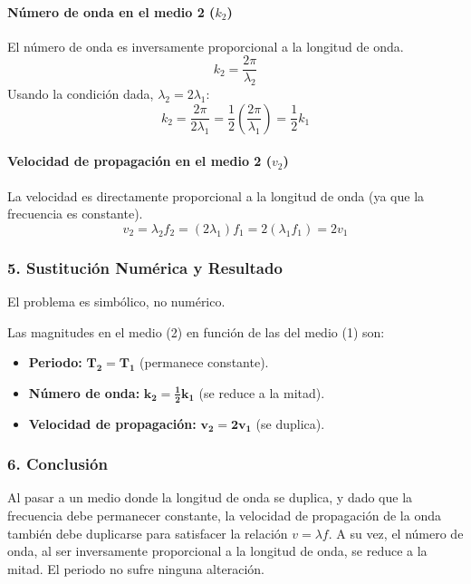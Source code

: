 \paragraph*{Número de onda en el medio 2 ($k_2$)}
El número de onda es inversamente proporcional a la longitud de onda.
$$ k_2 = \frac{2\pi}{\lambda_2} $$
Usando la condición dada, $\lambda_2 = 2\lambda_1$:
$$ k_2 = \frac{2\pi}{2\lambda_1} = \frac{1}{2} \left(\frac{2\pi}{\lambda_1}\right) = \frac{1}{2} k_1 $$

\paragraph*{Velocidad de propagación en el medio 2 ($v_2$)}
La velocidad es directamente proporcional a la longitud de onda (ya que la frecuencia es constante).
$$ v_2 = \lambda_2 f_2 = (2\lambda_1) f_1 = 2(\lambda_1 f_1) = 2v_1 $$

\subsubsection*{5. Sustitución Numérica y Resultado}
El problema es simbólico, no numérico.
\begin{cajaresultado}
Las magnitudes en el medio (2) en función de las del medio (1) son:
\begin{itemize}
    \item \textbf{Periodo:} $\boldsymbol{T_2 = T_1}$ (permanece constante).
    \item \textbf{Número de onda:} $\boldsymbol{k_2 = \frac{1}{2}k_1}$ (se reduce a la mitad).
    \item \textbf{Velocidad de propagación:} $\boldsymbol{v_2 = 2v_1}$ (se duplica).
\end{itemize}
\end{cajaresultado}

\subsubsection*{6. Conclusión}
\begin{cajaconclusion}
Al pasar a un medio donde la longitud de onda se duplica, y dado que la frecuencia debe permanecer constante, la velocidad de propagación de la onda también debe duplicarse para satisfacer la relación $v=\lambda f$. A su vez, el número de onda, al ser inversamente proporcional a la longitud de onda, se reduce a la mitad. El periodo no sufre ninguna alteración.
\end{cajaconclusion}

